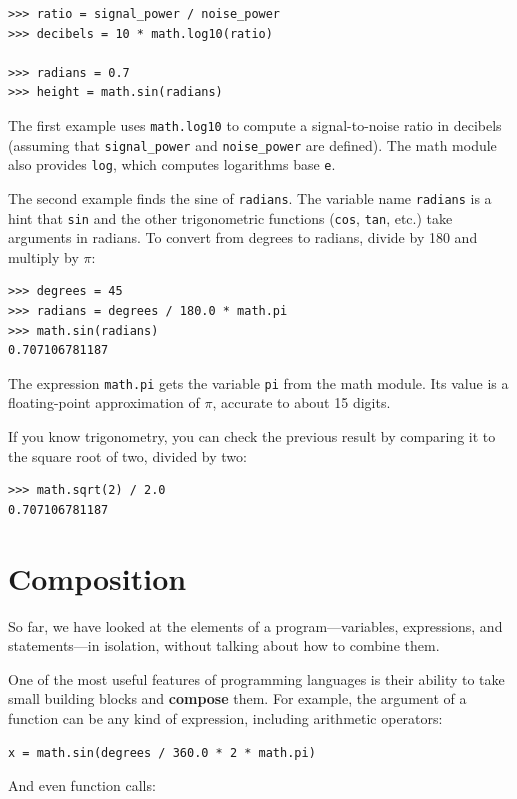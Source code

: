\documentclass[10pt]{book}
\begin{document}
\begin{verbatim}
>>> ratio = signal_power / noise_power
>>> decibels = 10 * math.log10(ratio)

>>> radians = 0.7
>>> height = math.sin(radians)
\end{verbatim}
%
The first example uses \verb"math.log10" to compute 
a signal-to-noise ratio in decibels (assuming that \verb"signal_power" and
\verb"noise_power" are defined).  The math module also provides {\tt log},
which computes logarithms base {\tt e}.

The second example finds the sine of {\tt radians}.  The variable name {\tt radians} is a hint that {\tt sin} and the other trigonometric
functions ({\tt cos}, {\tt tan}, etc.)  take arguments in radians. To
convert from degrees to radians, divide by 180 and multiply by
$\pi$:

\begin{verbatim}
>>> degrees = 45
>>> radians = degrees / 180.0 * math.pi
>>> math.sin(radians)
0.707106781187
\end{verbatim}
%
The expression {\tt math.pi} gets the variable {\tt pi} from the math
module.  Its value is a floating-point approximation
of $\pi$, accurate to about 15 digits.

If you know
trigonometry, you can check the previous result by comparing it to
the square root of two, divided by two:

\begin{verbatim}
>>> math.sqrt(2) / 2.0
0.707106781187
\end{verbatim}
%

\section{Composition}

So far, we have looked at the elements of a program---variables,
expressions, and statements---in isolation, without talking about how to
combine them.

One of the most useful features of programming languages is their
ability to take small building blocks and {\bf compose} them.  For
example, the argument of a function can be any kind of expression,
including arithmetic operators:

\begin{verbatim}
x = math.sin(degrees / 360.0 * 2 * math.pi)
\end{verbatim}
%
And even function calls:
\end{document}

